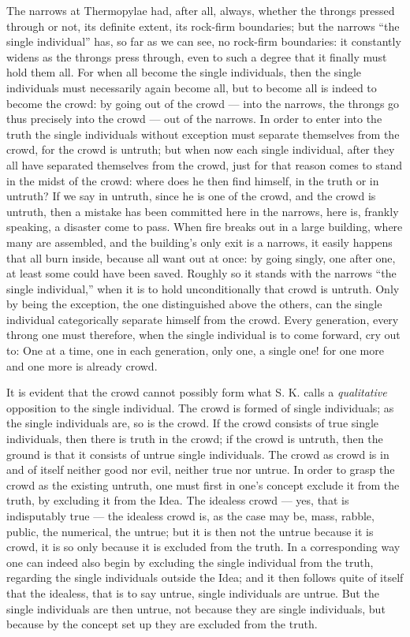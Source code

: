 \documentclass[12pt,a4paper,openany]{book}
\newcommand{\opage}[1]{\marginnote{\footnotesize\textit{[#1]}}}
\begin{document}
The narrows at Thermopylae had, after all, always, whether
the throngs pressed through or not, its definite
extent, its rock-firm boundaries; but the narrows
``the single individual'' has, so far as we can see, no
rock-firm boundaries: it constantly widens as
the throngs press through, even to such a degree that it
finally must hold them all. For when all become the single individuals,
then the single individuals must necessarily again become all,
but to become all is indeed to become the crowd: by going
out of the crowd --- into the narrows, the throngs go
thus precisely into the crowd --- out of the narrows.
In order to enter into the truth the single individuals without exception must separate
themselves from the crowd, for the crowd is untruth;
but when now each single individual, after they all have
separated themselves from the crowd, just for that reason comes
to stand in the midst of the crowd: where does he then find himself, in
the truth or in untruth? If we say in untruth,
since he is one of the crowd, and the crowd is untruth,
then a mistake has been committed here in the narrows, here is,
frankly speaking, a disaster come to pass. When fire breaks out in a
large building, where many are assembled, and the building's
only exit is a narrows, it easily happens that
\setcounter{footnote}{0}%
\opage{29}all burn inside, because all want out at once: by
going singly, one after one, at least
some could have been saved. Roughly so it stands
with the narrows ``the single individual,'' when it is to hold
unconditionally that crowd is untruth. Only by being
the exception, the one distinguished above the others, can the
single individual categorically separate himself from the crowd. Every
generation, every throng one must therefore, when the single individual
is to come forward, cry out to: One at a time, one in each generation,
only one, a single one! for one more and one more is already
crowd.

It is evident that the crowd cannot possibly form
what S. K. calls a \emph{qualitative} opposition to the
single individual. The crowd is formed of single individuals; as the single individuals
are, so is the crowd. If the crowd consists of true
single individuals, then there is truth in the crowd; if the crowd is
untruth, then the ground is that it consists of
untrue single individuals. The crowd as crowd is in and of itself
neither good nor evil, neither true nor untrue. In order
to grasp the crowd as the existing untruth, one must
first in one's concept exclude it from the truth, by
excluding it from the Idea. The idealess crowd --- yes,
that is indisputably true --- the idealess crowd is, as the case may be,
mass, rabble, public, the numerical,
the untrue; but it is then not the untrue
because it is crowd, it is so only because it is excluded
from the truth. In a corresponding way one can
indeed also begin by excluding the single individual from
the truth, regarding the single individuals outside the Idea; and it
then follows quite of itself that the idealess, that is to say
untrue, single individuals are untrue. But the single individuals are then
\setcounter{footnote}{0}%
\opage{30}untrue, not because they are single individuals, but because by
the concept set up they are excluded from the truth.
\end{document}
